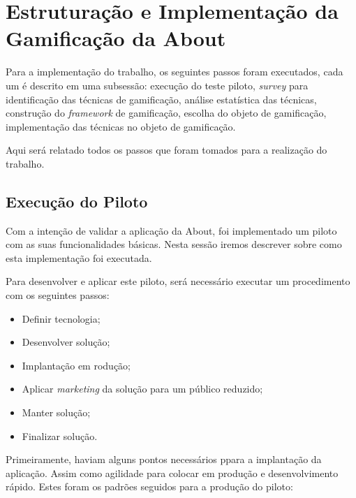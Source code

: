 \chapter[Estruturação e Implementação da Gamificação da About]{Estruturação e Implementação da Gamificação da About}

Para a implementação do trabalho, os seguintes
passos foram executados, cada um é
descrito em uma subsessão: execução do teste piloto, \textit{survey} para identificação das técnicas de gamificação,
análise estatística das técnicas, construção do \textit{framework} de gamificação, escolha do objeto de gamificação,
implementação das técnicas no objeto de gamificação.

Aqui será relatado todos os passos que foram tomados para a realização do trabalho.




\section{Execução do Piloto}
\label{sec:execucao_do_piloto}
Com a intenção de validar a aplicação da About, foi implementado um piloto com as suas funcionalidades
básicas. Nesta sessão iremos descrever sobre como esta implementação foi executada.

Para desenvolver e aplicar este piloto, será necessário executar um procedimento
com os seguintes passos:

\begin{itemize}
    \item Definir tecnologia;
    \item Desenvolver solução;
    \item Implantação em rodução;
    \item Aplicar \textit{marketing} da solução para um público reduzido;
    \item Manter solução;
    \item Finalizar solução.
\end{itemize}

Primeiramente, haviam alguns pontos necessários ppara a implantação da aplicação. Assim como agilidade para colocar
em produção e desenvolvimento rápido. Estes foram os padrões seguidos para a produção do piloto:


